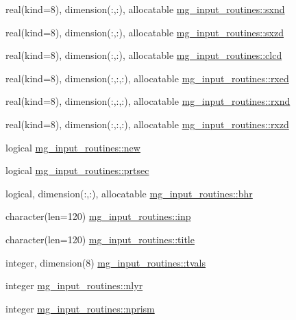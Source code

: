 \begin{DoxyCompactItemize}
\item 
real(kind=8), dimension(\+:,\+:), allocatable \hyperlink{namespacemg__input__routines_a37d88ac022398dee17396a07fc8e8be7}{mg\+\_\+input\+\_\+routines\+::sxnd}
\item 
real(kind=8), dimension(\+:,\+:), allocatable \hyperlink{namespacemg__input__routines_ab1f662ce65466e18b9990781d43c69a6}{mg\+\_\+input\+\_\+routines\+::sxzd}
\item 
real(kind=8), dimension(\+:,\+:), allocatable \hyperlink{namespacemg__input__routines_a3f4fc21cf71d14b405a57f9ede298ded}{mg\+\_\+input\+\_\+routines\+::clcd}
\item 
real(kind=8), dimension(\+:,\+:,\+:), allocatable \hyperlink{namespacemg__input__routines_ac5fa3dbae21f3b50a0d459cd16b5f71e}{mg\+\_\+input\+\_\+routines\+::rxed}
\item 
real(kind=8), dimension(\+:,\+:,\+:), allocatable \hyperlink{namespacemg__input__routines_a0d3dec62594ac0a9bb0c284a3d60738d}{mg\+\_\+input\+\_\+routines\+::rxnd}
\item 
real(kind=8), dimension(\+:,\+:,\+:), allocatable \hyperlink{namespacemg__input__routines_a3ad7b0263bc7a7f0977d8d3ab49cd027}{mg\+\_\+input\+\_\+routines\+::rxzd}
\item 
logical \hyperlink{namespacemg__input__routines_a733484f25916ecd427704c6769db1ba1}{mg\+\_\+input\+\_\+routines\+::new}
\item 
logical \hyperlink{namespacemg__input__routines_a341f268b2c10aec79f94e1cec9e49f24}{mg\+\_\+input\+\_\+routines\+::prtsec}
\item 
logical, dimension(\+:,\+:), allocatable \hyperlink{namespacemg__input__routines_ab21b53ae17d7a35ba5def7f4466da62d}{mg\+\_\+input\+\_\+routines\+::bhr}
\item 
character(len=120) \hyperlink{namespacemg__input__routines_a8e5e63f1a08c24f363056fa6ddf7b302}{mg\+\_\+input\+\_\+routines\+::inp}
\item 
character(len=120) \hyperlink{namespacemg__input__routines_ad134a146aceaea3fe8797e03a5b2c1d8}{mg\+\_\+input\+\_\+routines\+::title}
\item 
integer, dimension(8) \hyperlink{namespacemg__input__routines_aa5b99396ff2ca0434263e6b60c15dbf4}{mg\+\_\+input\+\_\+routines\+::tvals}
\item 
integer \hyperlink{namespacemg__input__routines_a63f2aa3d62b92a05e5c5122cb74900b1}{mg\+\_\+input\+\_\+routines\+::nlyr}
\item 
integer \hyperlink{namespacemg__input__routines_ae039cf2b2315725a320ddc429e0f22ca}{mg\+\_\+input\+\_\+routines\+::nprism}

\end{DoxyCompactItemize}
